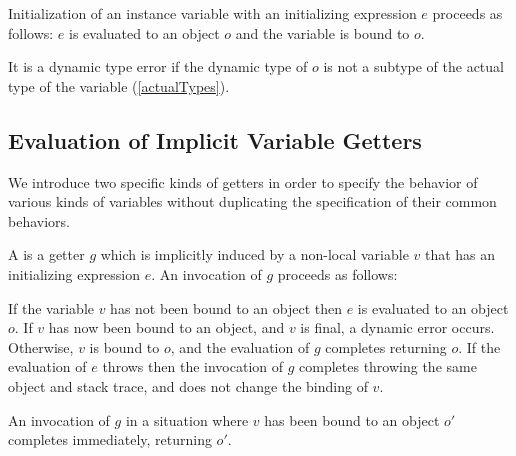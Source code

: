\documentclass[makeidx]{article}
\begin{document}
\LMHash{}%
%
Initialization of an instance variable \id{}
with an initializing expression $e$
proceeds as follows:
$e$ is evaluated to an object $o$
and the variable \id{} is bound to $o$.



\LMHash{}%
It is a dynamic type error if the dynamic type of $o$ is not
a subtype of the actual type of the variable \id{}
(\ref{actualTypes}).


\subsection{Evaluation of Implicit Variable Getters}

\LMHash{}%
We introduce two specific kinds of getters in order to specify
the behavior of various kinds of variables
without duplicating the specification of their common behaviors.

\LMHash{}%
A
is a getter $g$ which is implicitly induced by a non-local variable $v$
that has an initializing expression $e$.
An invocation of $g$ proceeds as follows:

\LMHash{}%
If the variable $v$ has not been bound to an object then
$e$ is evaluated to an object $o$.
If $v$ has now been bound to an object, and $v$ is final,
a dynamic error occurs. %
Otherwise, $v$ is bound to $o$,
and the evaluation of $g$ completes returning $o$.
If the evaluation of $e$ throws then
the invocation of $g$ completes throwing the same object and stack trace,
and does not change the binding of $v$.

\LMHash{}%
An invocation of $g$ in a situation where $v$ has been bound to an object $o'$
completes immediately, returning $o'$.

\end{document}
